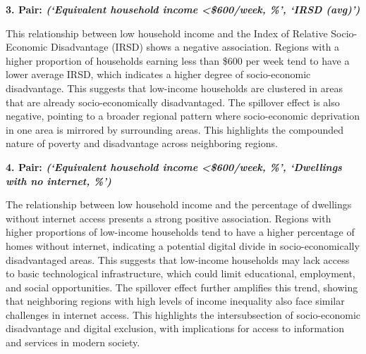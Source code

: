 \documentclass[
	a4paper, %
	10pt, %
	unnumberedsections, %
	twoside, %
]{LTJournalArticle}
\begin{document}
\textbf{3. Pair: \textit{(‘Equivalent household income <\$600/week, \%’, ‘IRSD (avg)’)}} 

This relationship between low household income and the Index of Relative Socio-Economic Disadvantage (IRSD) shows a negative association. Regions with a higher proportion of households earning less than \$600 per week tend to have a lower average IRSD, which indicates a higher degree of socio-economic disadvantage. This suggests that low-income households are clustered in areas that are already socio-economically disadvantaged. The spillover effect is also negative, pointing to a broader regional pattern where socio-economic deprivation in one area is mirrored by surrounding areas. This highlights the compounded nature of poverty and disadvantage across neighboring regions.


\textbf{4. Pair: \textit{(‘Equivalent household income <\$600/week, \%’, ‘Dwellings with no internet, \%’)}} 

The relationship between low household income and the percentage of dwellings without internet access presents a strong positive association. Regions with higher proportions of low-income households tend to have a higher percentage of homes without internet, indicating a potential digital divide in socio-economically disadvantaged areas. This suggests that low-income households may lack access to basic technological infrastructure, which could limit educational, employment, and social opportunities. The spillover effect further amplifies this trend, showing that neighboring regions with high levels of income inequality also face similar challenges in internet access. This highlights the intersubsection of socio-economic disadvantage and digital exclusion, with implications for access to information and services in modern society.



\pagebreak

\onecolumn
\end{document}
